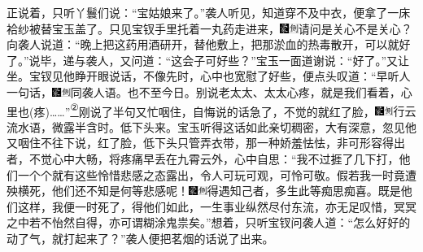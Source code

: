 正说着，只听丫鬟们说：``宝姑娘来了。''袭人听见，知道穿不及中衣，便拿了一床袷纱被替宝玉盖了。只见宝钗手里托着一丸药走进来，{\includegraphics[width=3mm]{../Images/00006}\includegraphics[width=3mm]{../Images/00011}\footnotesize \kaishu 请问是关心不是关心？}向袭人说道：``晚上把这药用酒研开，替他敷上，把那淤血的热毒散开，可以就好了。''说毕，递与袭人，又问道：``这会子可好些？''宝玉一面道谢说：``好了。''又让坐。宝钗见他睁开眼说话，不像先时，心中也宽慰了好些，便点头叹道：``早听人一句话，{\includegraphics[width=3mm]{../Images/00006}\includegraphics[width=3mm]{../Images/00011}\footnotesize \kaishu 同袭人语。}也不至今日。别说老太太、太太心疼，就是我们看着，心里也{(疼)}\ldots{}\ldots{}''\href{../Text/part0038_split_000.html\#lnkback_2_a}{\textsuperscript{②}}刚说了半句又忙咽住，自悔说的话急了，不觉的就红了脸，{\includegraphics[width=3mm]{../Images/00006}\includegraphics[width=3mm]{../Images/00011}\footnotesize \kaishu 行云流水语，微露半含时。}低下头来。宝玉听得这话如此亲切稠密，大有深意，忽见他又咽住不往下说，红了脸，低下头只管弄衣带，那一种娇羞怯怯，非可形容得出者，不觉心中大畅，将疼痛早丢在九霄云外，心中自思：``我不过捱了几下打，他们一个个就有这些怜惜悲感之态露出，令人可玩可观，可怜可敬。假若我一时竟遭殃横死，他们还不知是何等悲感呢！{\includegraphics[width=3mm]{../Images/00006}\includegraphics[width=3mm]{../Images/00011}\footnotesize \kaishu 得遇知己者，多生此等痴思痴喜。}既是他们这样，我便一时死了，得他们如此，一生事业纵然尽付东流，亦无足叹惜，冥冥之中若不怡然自得，亦可谓糊涂鬼祟矣。''想着，只听宝钗问袭人道：``怎么好好的动了气，就打起来了？''袭人便把茗烟的话说了出来。

